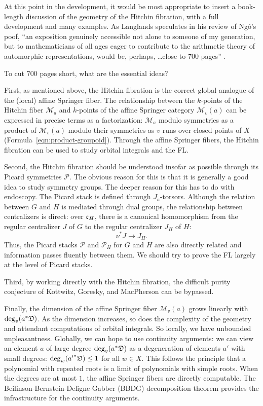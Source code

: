 \documentclass[brochure,english,12pt]{bourbaki}
\def\cc{\frak{c}}
\def\DIV{{\frak{D}}}
\def\M{{\mathcal M}}
\def\P{{\mathcal P}}
\begin{document}
At this point in the development, it would be most appropriate to
insert a book-length discussion of the geometry of the Hitchin
fibration, with a full development and many examples.  As Langlands
speculates in his review of Ng\^o's poof, ``an exposition genuinely
accessible not alone to someone of my generation, but to
mathematicians of all ages eager to contribute to the arithmetic
theory of automorphic representations, would be, perhaps, \ldots close
to 700 pages'' \cite{L:Ngo}.

To cut  $700$ pages short, what are the essential ideas?  

First, as mentioned above, the Hitchin fibration is the correct global
analogue of the (local) affine Springer fiber.  The relationship
between the $k$-points of the Hitchin fiber $\M_a$ and $k$-points
of the affine Springer category $\M_v(a)$ can be expressed in
precise terms as a factorization: $\M_a$ modulo
symmetries as a product of $\M_v(a)$ modulo their symmetries as $v$
runs over closed points of $X$ (Formula~\ref{eqn:product-groupoid}).  Through
the affine Springer fibers, the Hitchin fibration can be used to study
orbital integrals and the FL.

Second, the Hitchin fibration should be understood insofar as possible
through its Picard symmetries $\P$.  The obvious reason for this is that it
is generally a good idea to study symmetry groups.  The deeper reason
for this has to do with endoscopy.  The Picard stack is defined through
$J_a$-torsors.  Although the relation between $G$ and $H$ is mediated
through dual groups, the relationship between centralizers is direct:
over $\cc_H$, there is a canonical homomorphism from the regular
centralizer $J$ of $G$ to the regular centralizer $J_H$ of $H$:
\begin{equation}\label{eqn:JH}
\nu^*J\to J_H.
\end{equation}
Thus, the Picard stacks $\P$ and $\P_H$ for $G$ and $H$ are also
directly related and information passes fluently between them.  We should try to prove the FL
 largely at the level of Picard stacks.

Third, by working directly with the Hitchin fibration, the difficult
purity conjecture of Kottwitz, Goresky, and MacPherson can be
bypassed.

Finally, the dimension of the affine Springer fiber $\M_v(a)$ grows
linearly with $\deg_v(a^* \DIV)$.  As the dimension increases, so does
the complexity of the geometry and attendant computations of orbital
integrals.  So locally, we have unbounded unpleasantness.  Globally, we
can hope to use continuity arguments: we can view an element $a$ of
large degree $\deg_v(a^*\DIV)$ as a degeneration of elements $a'$ with
small degrees: $\deg_w({a'}^*\DIV)\le 1$ for all $w\in X$.  This
follows the principle that a polynomial with repeated roots is a
limit of polynomials with simple roots.  When the degrees are
at most $1$, the affine Springer fibers are directly computable.  The
Beilinson-Bernstein-Deligne-Gabber (BBDG) decomposition theorem provides the
infrastructure for the continuity arguments.
\end{document}
